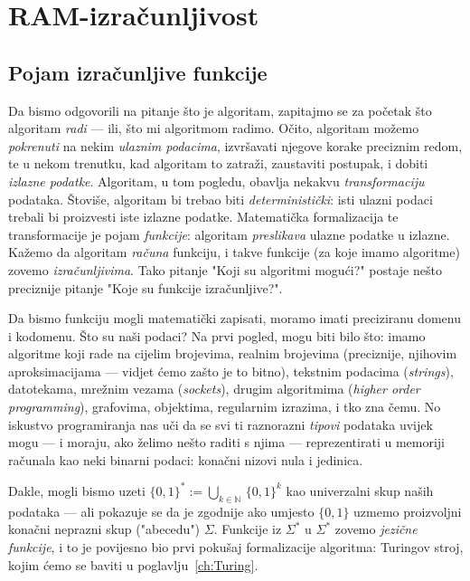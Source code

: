 \chapter{RAM-izračunljivost}

\section{Pojam izračunljive funkcije}

Da bismo odgovorili na pitanje što je algoritam, zapitajmo se za početak što algoritam \emph{radi}  --- ili, što mi algoritmom radimo. Očito, algoritam možemo \emph{pokrenuti} na nekim \emph{ulaznim podacima}, izvršavati njegove korake preciznim redom, te u nekom trenutku, kad algoritam to zatraži, zaustaviti postupak, i dobiti \emph{izlazne podatke}. Algoritam, u tom pogledu, obavlja nekakvu \emph{transformaciju} podataka. Štoviše, algoritam bi trebao biti \emph{deterministički}: isti ulazni podaci trebali bi proizvesti iste izlazne podatke. Matematička formalizacija te transformacije je pojam \emph{funkcije}: algoritam \emph{preslikava} ulazne podatke u izlazne. Kažemo da algoritam \emph{računa} funkciju, i takve funkcije (za koje imamo algoritme) zovemo \emph{izračunljivima}. Tako pitanje "Koji su algoritmi mogući?" postaje nešto preciznije pitanje "Koje su funkcije izračunljive?".


Da bismo funkciju mogli matematički zapisati, moramo imati preciziranu domenu i kodomenu. Što su naši podaci?
Na prvi pogled, mogu biti bilo što: imamo algoritme koji rade na cijelim brojevima, realnim brojevima (preciznije, njihovim aproksimacijama --- vidjet ćemo zašto je to bitno), tekstnim podacima (\emph{strings}), datotekama, mrežnim vezama (\emph{sockets}), drugim algoritmima (\emph{higher order programming}), grafovima, objektima, regularnim izrazima, i tko zna čemu. No iskustvo programiranja nas uči da se svi ti raznorazni \emph{tipovi} podataka uvijek mogu --- i moraju, ako želimo nešto raditi s njima --- reprezentirati u memoriji računala kao neki binarni podaci: konačni nizovi nula i jedinica.

Dakle, mogli bismo uzeti $\{0,1\}^*:=\bigcup_{k\in\mathbb N}\,\{0,1\}^k$ kao univerzalni skup naših podataka --- ali pokazuje se da je zgodnije ako umjesto $\{0,1\}$ uzmemo proizvoljni konačni neprazni skup ("abecedu") $\Sigma$. Funkcije iz $\Sigma^*$ u $\Sigma^*$ zovemo \emph{jezične funkcije}, i to je povijesno bio prvi pokušaj formalizacije algoritma: Turingov stroj, kojim ćemo se baviti u poglavlju~\ref{ch:Turing}.

